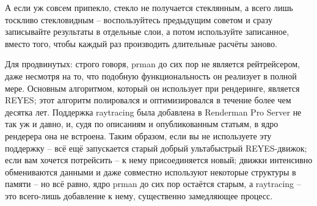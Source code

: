     А если уж совсем припекло, стекло не получается стеклянным, а всего
    лишь тоскливо стекловидным – воспользуйтесь предыдущим советом и
    сразу записывайте результаты в отдельные слои, а потом используйте
    записанное, вместо того, чтобы каждый раз производить длительные
    расчёты заново.
  

 Для
    продвинутых: строго говоря, prman
    до сих пор не является рейтрейсером, даже несмотря на то, что
    подобную функциональность он реализует в полной мере. Основным
    алгоритмом, который он использует при рендеринге, является REYES;
    этот алгоритм полировался и оптимизировался в течение более чем
    десятка лет. Поддержка raytracing была добавлена в Renderman Pro
    Server не так уж и давно, и, судя по описаниям и опубликованным
    статьям, в ядро рендерера она не встроена. Таким образом, если вы
    не используете эту поддержку – всё ещё запускается старый добрый
    ультабыстрый REYES-движок; если вам хочется потрейсить – к нему
    присоединяется новый; движки интенсивно обмениваются данными и даже
    совместно используют некоторые структуры в памяти – но всё равно,
    ядро prman до сих пор остаётся старым, а raytracing – это
    всего-лишь добавление к нему, существенно замедляющее
    процесс.